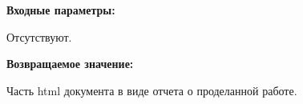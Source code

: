 \textbf{Входные параметры:}

Отсутствуют.

\textbf{Возвращаемое значение:}

Часть html документа в виде отчета о проделанной работе.